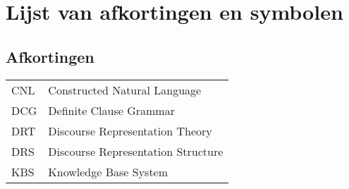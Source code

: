 \chapter{Lijst van afkortingen en symbolen}
\section*{Afkortingen}
\begin{flushleft}
  \renewcommand{\arraystretch}{1.1}
  \begin{tabularx}{\textwidth}{@{}p{12mm}X@{}}
    CNL   & Constructed Natural Language \\
    DCG   & Definite Clause Grammar \\
    DRT   & Discourse Representation Theory \\
    DRS   & Discourse Representation Structure \\
    KBS   & Knowledge Base System \\
  \end{tabularx}
\end{flushleft}
